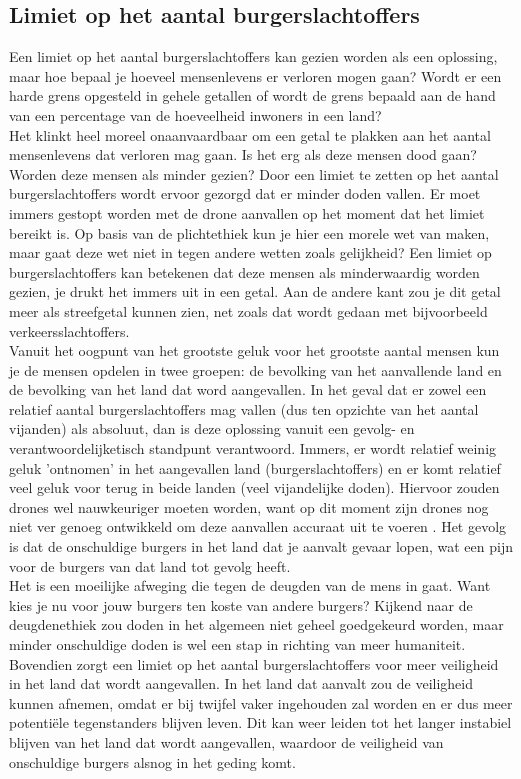 \subsection{Limiet op het aantal burgerslachtoffers}\label{chapter:limiet}
\subtitle{Nourdin Ait El Mehdi}
Een limiet op het aantal burgerslachtoffers kan gezien worden als een oplossing, maar hoe bepaal je hoeveel mensenlevens er verloren mogen gaan? Wordt er een harde grens opgesteld in gehele getallen of wordt de grens bepaald aan de hand van een percentage van de hoeveelheid inwoners in een land? \\

Het klinkt heel moreel onaanvaardbaar om een getal te plakken aan het aantal mensenlevens dat verloren mag gaan. Is het erg als deze mensen dood gaan? Worden deze mensen als minder gezien? Door een limiet te zetten op het aantal burgerslachtoffers wordt ervoor gezorgd dat er minder doden vallen. Er moet immers gestopt worden met de drone aanvallen op het moment dat het limiet bereikt is. Op basis van de plichtethiek kun je hier een morele wet van maken, maar gaat deze wet niet in tegen andere wetten zoals gelijkheid? Een limiet op burgerslachtoffers kan betekenen dat deze mensen als minderwaardig worden gezien, je drukt het immers uit in een getal. Aan de andere kant zou je dit getal meer als streefgetal kunnen zien, net zoals dat wordt gedaan met bijvoorbeeld verkeersslachtoffers.\\


Vanuit het oogpunt van het grootste geluk voor het grootste aantal mensen kun je de mensen opdelen in twee groepen: de bevolking van het aanvallende land en de bevolking van het land dat word aangevallen. In het geval dat er zowel een relatief aantal burgerslachtoffers mag vallen (dus ten opzichte van het aantal vijanden) als absoluut, dan is deze oplossing vanuit een gevolg- en verantwoordelijketisch standpunt verantwoord. Immers, er wordt relatief weinig geluk 'ontnomen' in het aangevallen land (burgerslachtoffers) en er komt relatief veel geluk voor terug in beide landen (veel vijandelijke doden). Hiervoor zouden drones wel nauwkeuriger moeten worden, want op dit moment zijn drones nog niet ver genoeg ontwikkeld om deze aanvallen accuraat uit te voeren \cite{papers}. Het gevolg is dat de onschuldige burgers in het land dat je aanvalt gevaar lopen, wat een pijn voor de burgers van dat land tot gevolg heeft.\\

Het is een moeilijke afweging die tegen de deugden van de mens in gaat. Want kies je nu voor jouw burgers ten koste van andere burgers? Kijkend naar de deugdenethiek zou doden in het algemeen niet geheel goedgekeurd worden, maar minder onschuldige doden is wel een stap in richting van meer humaniteit. Bovendien zorgt een limiet op het aantal burgerslachtoffers voor meer veiligheid in het land dat wordt aangevallen. In het land dat aanvalt zou de veiligheid kunnen afnemen, omdat er bij twijfel vaker ingehouden zal worden en er dus meer potenti\"ele tegenstanders blijven leven. Dit kan weer leiden tot het langer instabiel blijven van het land dat wordt aangevallen, waardoor de veiligheid van onschuldige burgers alsnog in het geding komt.\\
  
